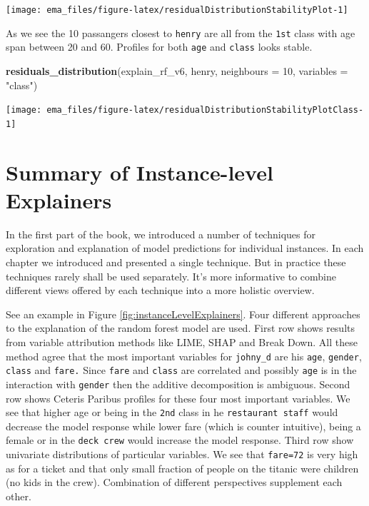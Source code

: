 \documentclass[12pt,]{krantz}
\newenvironment{Shaded}{\begin{snugshade}}{\end{snugshade}}
\newcommand{\DataTypeTok}[1]{\textcolor[rgb]{0.13,0.29,0.53}{#1}}
\newcommand{\DecValTok}[1]{\textcolor[rgb]{0.00,0.00,0.81}{#1}}
\newcommand{\KeywordTok}[1]{\textcolor[rgb]{0.13,0.29,0.53}{\textbf{#1}}}
\newcommand{\NormalTok}[1]{#1}
\newcommand{\StringTok}[1]{\textcolor[rgb]{0.31,0.60,0.02}{#1}}
\begin{document}
\begin{center}\texttt{[image: ema\_files/figure-latex/residualDistributionStabilityPlot-1]} \end{center}

As we see the 10 passangers closest to \texttt{henry} are all from the \texttt{1st} class with age span between 20 and 60. Profiles for both \texttt{age} and \texttt{class} looks stable.

\begin{Shaded}
\begin{Highlighting}[]
\KeywordTok{residuals_distribution}\NormalTok{(explain_rf_v6,}
\NormalTok{                          henry, }
                       \DataTypeTok{neighbours =} \DecValTok{10}\NormalTok{,}
                       \DataTypeTok{variables =} \StringTok{"class"}\NormalTok{)}
\end{Highlighting}
\end{Shaded}

\begin{center}\texttt{[image: ema\_files/figure-latex/residualDistributionStabilityPlotClass-1]} \end{center}

\hypertarget{summaryInstanceLevel}{%
\section{Summary of Instance-level Explainers}\label{summaryInstanceLevel}}

In the first part of the book, we introduced a number of techniques for exploration and explanation of model predictions for individual instances.
In each chapter we introduced and presented a single technique.
But in practice these techniques rarely shall be used separately. It's more informative to combine different views offered by each technique into a more holistic overview.

See an example in Figure \ref{fig:instanceLevelExplainers}. Four different approaches to the explanation of the random forest model are used.
First row shows results from variable attribution methods like LIME, SHAP and Break Down. All these method agree that the most important variables for \texttt{johny\_d} are his \texttt{age}, \texttt{gender}, \texttt{class} and \texttt{fare.} Since \texttt{fare} and \texttt{class} are correlated and possibly \texttt{age} is in the interaction with \texttt{gender} then the additive decomposition is ambiguous.
Second row shows Ceteris Paribus profiles for these four most important variables. We see that higher age or being in the \texttt{2nd} class in he \texttt{restaurant\ staff} would decrease the model response while lower fare (which is counter intuitive), being a female or in the \texttt{deck\ crew} would increase the model response.
Third row show univariate distributions of particular variables. We see that \texttt{fare=72} is very high as for a ticket and that only small fraction of people on the titanic were children (no kids in the crew). Combination of different perspectives supplement each other.
\end{document}
